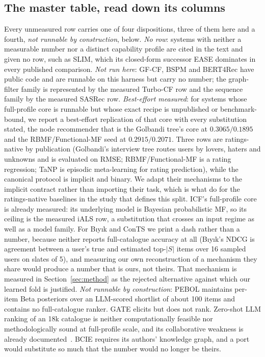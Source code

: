 \documentclass[manuscript,screen,review]{acmart}
\begin{document}
\subsection{The master table, read down its columns}
Every unmeasured row carries one of four dispositions, three of them here and a fourth, \emph{not runnable by construction}, below. \emph{No row}: systems with neither a measurable number nor a distinct capability profile are cited in the text and given no row, such as SLIM, which its closed-form successor EASE dominates in every published comparison. \emph{Not run here}: GF-CF, BSPM and BERT4Rec have public code and are runnable on this harness but carry no number; the graph-filter family is represented by the measured Turbo-CF row and the sequence family by the measured SASRec row. \emph{Best-effort measured}: for systems whose full-profile core is runnable but whose exact recipe is unpublished or benchmark-bound, we report a best-effort replication of that core with every substitution stated, the node recommender that is the Golbandi tree's core at $0.3065/0.1895$ and the RBMF/Functional-MF seed at $0.2915/0.2071$. Three rows are ratings-native by publication (Golbandi's interview tree routes users by lovers, haters and unknowns and is evaluated on RMSE; RBMF/Functional-MF is a rating regression; TaNP is episodic meta-learning for rating prediction), while the canonical protocol is implicit and binary. We adapt their mechanisms to the implicit contract rather than importing their task, which is what \citet{liang2018variational} do for the ratings-native baselines in the study that defines this split. ICF's full-profile core is already measured: its underlying model is Bayesian probabilistic MF, so its ceiling is the measured iALS row, a substitution that crosses an input regime as well as a model family. For B\i y\i k and ConTS we print a dash rather than a number, because neither reports full-catalogue accuracy at all (B\i y\i k's NDCG is agreement between a user's true and estimated top-$|S|$ items over 16 sampled users on slates of 5), and measuring our own reconstruction of a mechanism they share would produce a number that is ours, not theirs. That mechanism is measured in Section~\ref{sec:method} as the rejected alternative against which our learned fold is justified. \emph{Not runnable by construction}: PEBOL maintains per-item Beta posteriors over an LLM-scored shortlist of about 100 items and contains no full-catalogue ranker. GATE elicits but does not rank. Zero-shot LLM ranking of an 18k catalogue is neither computationally feasible nor methodologically sound at full-profile scale, and its collaborative weakness is already documented~\citep{he2023large}. BCIE requires its authors' knowledge graph, and a port would substitute so much that the number would no longer be theirs.
\end{document}
